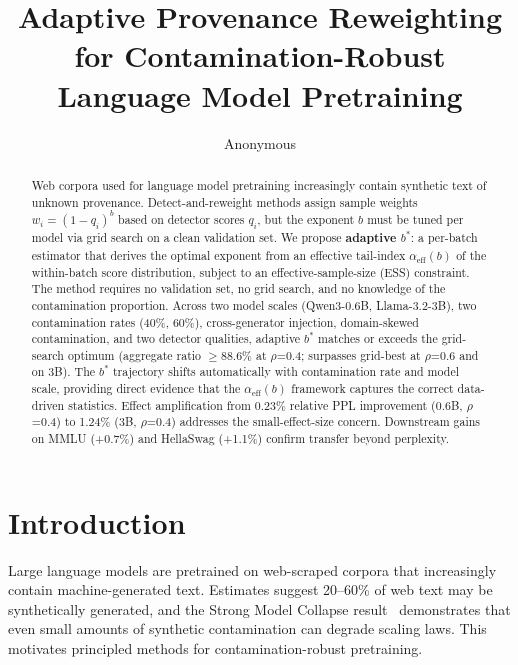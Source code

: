 \documentclass[11pt]{article}
\title{Adaptive Provenance Reweighting for Contamination-Robust Language Model Pretraining}
\author{Anonymous}
\date{}
\begin{document}
\maketitle

\begin{abstract}
Web corpora used for language model pretraining increasingly contain synthetic text of unknown provenance. Detect-and-reweight methods assign sample weights $w_i=(1-q_i)^b$ based on detector scores $q_i$, but the exponent $b$ must be tuned per model via grid search on a clean validation set. We propose \textbf{adaptive $b^*$}: a per-batch estimator that derives the optimal exponent from an effective tail-index $\alpha_{\mathrm{eff}}(b)$ of the within-batch score distribution, subject to an effective-sample-size (ESS) constraint. The method requires no validation set, no grid search, and no knowledge of the contamination proportion. Across two model scales (Qwen3-0.6B, Llama-3.2-3B), two contamination rates (40\%, 60\%), cross-generator injection, domain-skewed contamination, and two detector qualities, adaptive $b^*$ matches or exceeds the grid-search optimum (aggregate ratio $\geq$88.6\% at $\rho$=0.4; surpasses grid-best at $\rho$=0.6 and on 3B). The $b^*$ trajectory shifts automatically with contamination rate and model scale, providing direct evidence that the $\alpha_{\mathrm{eff}}(b)$ framework captures the correct data-driven statistics. Effect amplification from 0.23\% relative PPL improvement (0.6B, $\rho$=0.4) to 1.24\% (3B, $\rho$=0.4) addresses the small-effect-size concern. Downstream gains on MMLU (+0.7\%) and HellaSwag (+1.1\%) confirm transfer beyond perplexity.
\end{abstract}

\section{Introduction}
\label{sec:intro}

Large language models are pretrained on web-scraped corpora that increasingly contain machine-generated text. Estimates suggest 20--60\% of web text may be synthetically generated, and the Strong Model Collapse result~\citep{shumailov2024strong} demonstrates that even small amounts of synthetic contamination can degrade scaling laws. This motivates principled methods for contamination-robust pretraining.
\end{document}
